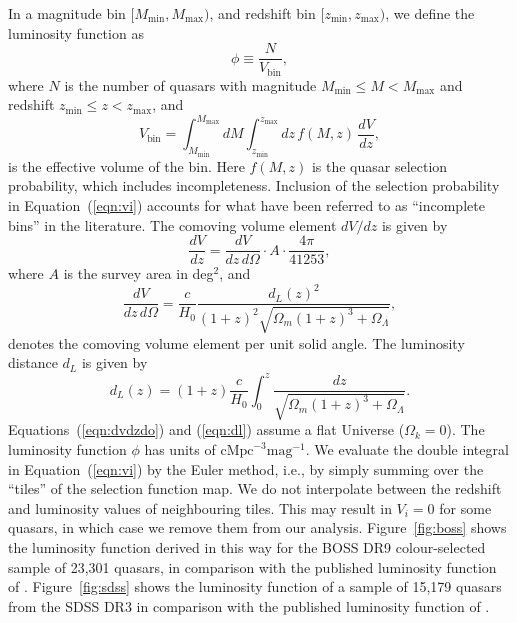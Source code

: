 \documentclass[a4paper,fleqn,usenatbib]{mnras}
\begin{document}
In a magnitude bin $[M_\mathrm{min}, M_\mathrm{max})$, and redshift
  bin $[z_\mathrm{min}, z_\mathrm{max})$, we define the luminosity
    function as \citep{2000MNRAS.311..433P}
  \begin{equation}
    \phi \equiv \frac{N}{V_\mathrm{bin}},
  \end{equation}
  where $N$ is the number of quasars with magnitude
  $M_\mathrm{min}\leq M<M_\mathrm{max}$ and redshift
  $z_\mathrm{min}\leq z<z_\mathrm{max}$, and
  \begin{equation}
    V_\mathrm{bin} = \int_{M_\mathrm{min}}^{M_\mathrm{max}}dM\int_{z_\mathrm{min}}^{z_\mathrm{max}}dz\, f(M, z)\,\frac{dV}{dz},
    \label{eqn:vi}
  \end{equation}
  is the effective volume of the bin.  Here $f(M,z)$ is the quasar
  selection probability, which includes incompleteness.  Inclusion of
  the selection probability in Equation~(\ref{eqn:vi}) accounts for
  what have been referred to as ``incomplete bins'' in the literature.
  The comoving volume element $dV/dz$ is given by
  \begin{equation}
    \frac{dV}{dz}=\frac{dV}{dz\,d\Omega}\cdot A\cdot\frac{4\pi}{41253},
  \end{equation}
  where $A$ is the survey area in deg$^2$, and \citep{1999astro.ph..5116H}
  \begin{equation}
    \frac{dV}{dz\,d\Omega}=\frac{c}{H_0}\frac{d_L(z)^2}{(1+z)^2\sqrt{\Omega_m(1+z)^3+\Omega_\Lambda}},
    \label{eqn:dvdzdo}
  \end{equation}
  denotes the comoving volume element per unit solid angle.  The
  luminosity distance $d_L$ is given by
  \begin{equation}
    d_L(z)=(1+z)\frac{c}{H_0}\int_0^z\frac{dz}{\sqrt{\Omega_m(1+z)^3+\Omega_\Lambda}}.
    \label{eqn:dl}
  \end{equation}
  Equations~(\ref{eqn:dvdzdo}) and (\ref{eqn:dl}) assume a flat
  Universe ($\Omega_k=0$).  The luminosity function $\phi$ has units
  of $\mathrm{cMpc}^{-3}\mathrm{mag}^{-1}$.  We evaluate the double
  integral in Equation~(\ref{eqn:vi}) by the Euler method, i.e., by
  simply summing over the ``tiles'' of the selection function map.  We
  do not interpolate between the redshift and luminosity values of
  neighbouring tiles.  This may result in $V_i=0$ for some quasars, in
  which case we remove them from our analysis.  Figure~\ref{fig:boss}
  shows the luminosity function derived in this way for the BOSS DR9
  colour-selected sample of 23,301 quasars, in comparison with the
  published luminosity function of \citet{2013ApJ...773...14R}.
  Figure~\ref{fig:sdss} shows the luminosity function of a sample of
  15,179 quasars from the SDSS DR3 in comparison with the published
  luminosity function of \citet{2006AJ....131.2766R}.
\end{document}
